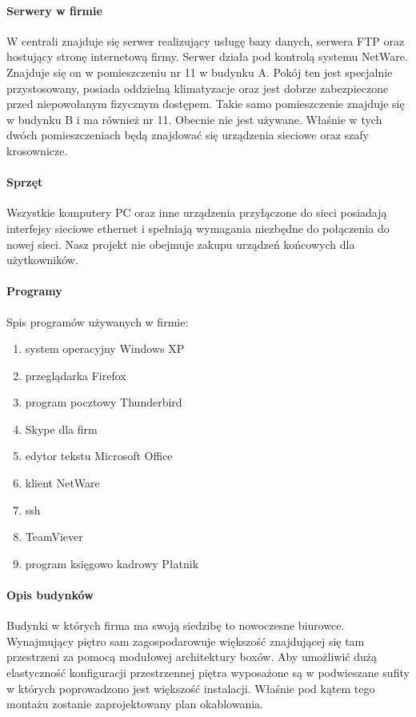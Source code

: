 \documentclass{report}
\begin{document}
\paragraph{Serwery w firmie}
W centrali znajduje się serwer realizujący usługę
bazy danych, serwera FTP oraz hostujący stronę internetową firmy. Serwer działa pod kontrolą systemu NetWare. Znajduje się on w
pomieszczeniu nr 11 w budynku A. Pokój ten jest specjalnie przystosowany, posiada oddzielną klimatyzacje oraz jest 
dobrze zabezpieczone przed niepowołanym fizycznym dostępem. Takie samo pomieszczenie znajduje się w budynku B i ma również nr 11. Obecnie nie jest
używane. Właśnie w tych dwóch pomieszczeniach będą znajdować się urządzenia sieciowe oraz szafy krosownicze.

\paragraph{Sprzęt}Wszystkie komputery PC oraz inne urządzenia przyłączone do sieci posiadają interfejsy sieciowe ethernet i spełniają wymagania niezbędne
do połączenia do nowej sieci. Nasz projekt nie obejmuje zakupu urządzeń końcowych dla użytkowników.

\paragraph{Programy} Spis programów używanych w firmie:
\begin{enumerate}
 \item system operacyjny Windows XP
 \item przeglądarka Firefox
 \item program pocztowy Thunderbird
 \item Skype dla firm
 \item edytor tekstu Microsoft Office
 \item klient NetWare
 \item ssh
 \item TeamViever
 \item program księgowo kadrowy Płatnik
\end{enumerate}

\paragraph{Opis budynków}Budynki w których firma ma swoją siedzibę to nowoczesne biurowce. Wynajmujący piętro sam zagospodarowuje większość 
znajdującej się tam przestrzeni za pomocą modułowej architektury boxów. Aby umożliwić dużą elastyczność konfiguracji przestrzennej piętra 
wyposażone są w podwieszane sufity w których poprowadzono jest większość instalacji. Właśnie pod kątem tego montażu zostanie zaprojektowany plan
okablowania.
\end{document}

